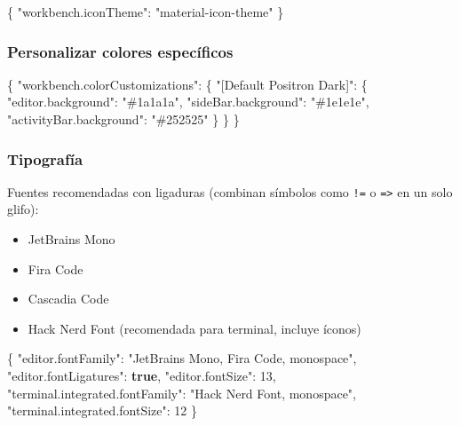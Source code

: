 \documentclass[
  doc,
  floatsintext,
  longtable,
  a4paper,
  nolmodern,
  notxfonts,
  notimes,
  12pt,
  colorlinks=true,linkcolor=blue,citecolor=blue,urlcolor=blue]{apa7}
\newenvironment{Shaded}{\begin{snugshade}}{\end{snugshade}}
\newcommand{\DataTypeTok}[1]{\textcolor[rgb]{0.68,0.00,0.00}{#1}}
\newcommand{\DecValTok}[1]{\textcolor[rgb]{0.68,0.00,0.00}{#1}}
\newcommand{\FunctionTok}[1]{\textcolor[rgb]{0.28,0.35,0.67}{#1}}
\newcommand{\KeywordTok}[1]{\textcolor[rgb]{0.00,0.23,0.31}{\textbf{#1}}}
\newcommand{\StringTok}[1]{\textcolor[rgb]{0.13,0.47,0.30}{#1}}
\providecommand{\tightlist}{%
  \setlength{\itemsep}{0pt}\setlength{\parskip}{0pt}}
\begin{document}
\begin{Shaded}
\begin{Highlighting}[]
\FunctionTok{\{}
  \DataTypeTok{"workbench.iconTheme"}\FunctionTok{:} \StringTok{"material{-}icon{-}theme"}
\FunctionTok{\}}
\end{Highlighting}
\end{Shaded}

\subsubsection{Personalizar colores
específicos}\label{personalizar-colores-especuxedficos}

\begin{Shaded}
\begin{Highlighting}[]
\FunctionTok{\{}
  \DataTypeTok{"workbench.colorCustomizations"}\FunctionTok{:} \FunctionTok{\{}
    \DataTypeTok{"[Default Positron Dark]"}\FunctionTok{:} \FunctionTok{\{}
      \DataTypeTok{"editor.background"}\FunctionTok{:} \StringTok{"\#1a1a1a"}\FunctionTok{,}
      \DataTypeTok{"sideBar.background"}\FunctionTok{:} \StringTok{"\#1e1e1e"}\FunctionTok{,}
      \DataTypeTok{"activityBar.background"}\FunctionTok{:} \StringTok{"\#252525"}
    \FunctionTok{\}}
  \FunctionTok{\}}
\FunctionTok{\}}
\end{Highlighting}
\end{Shaded}

\subsubsection{Tipografía}\label{tipografuxeda}

Fuentes recomendadas con ligaduras (combinan símbolos como \texttt{!=} o
\texttt{=\textgreater{}} en un solo glifo):

\begin{itemize}
\tightlist
\item
  JetBrains Mono
\item
  Fira Code
\item
  Cascadia Code
\item
  Hack Nerd Font (recomendada para terminal, incluye íconos)
\end{itemize}

\begin{Shaded}
\begin{Highlighting}[]
\FunctionTok{\{}
  \DataTypeTok{"editor.fontFamily"}\FunctionTok{:} \StringTok{"\textquotesingle{}JetBrains Mono\textquotesingle{}, \textquotesingle{}Fira Code\textquotesingle{}, monospace"}\FunctionTok{,}
  \DataTypeTok{"editor.fontLigatures"}\FunctionTok{:} \KeywordTok{true}\FunctionTok{,}
  \DataTypeTok{"editor.fontSize"}\FunctionTok{:} \DecValTok{13}\FunctionTok{,}
  \DataTypeTok{"terminal.integrated.fontFamily"}\FunctionTok{:} \StringTok{"\textquotesingle{}Hack Nerd Font\textquotesingle{}, monospace"}\FunctionTok{,}
  \DataTypeTok{"terminal.integrated.fontSize"}\FunctionTok{:} \DecValTok{12}
\FunctionTok{\}}
\end{Highlighting}
\end{Shaded}
\end{document}
